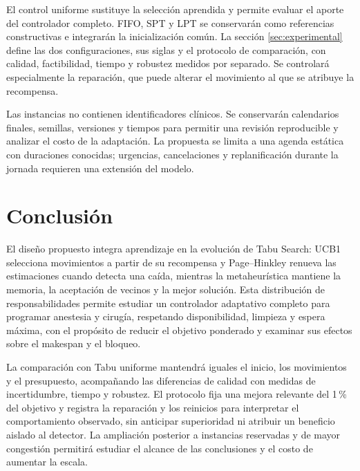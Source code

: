 \documentclass[12pt,letterpaper]{report}
\begin{document}
El control uniforme sustituye la selección aprendida y permite evaluar
el aporte del controlador completo. FIFO, SPT y LPT se conservarán como
referencias constructivas e integrarán la inicialización común. La sección
\ref{sec:experimental} define las dos configuraciones, sus siglas y el
protocolo de comparación, con calidad, factibilidad, tiempo y robustez
medidos por separado. Se controlará especialmente la reparación, que puede
alterar el movimiento al que se atribuye la recompensa.

Las instancias no contienen identificadores clínicos. Se conservarán
calendarios finales, semillas, versiones y tiempos para permitir una
revisión reproducible y analizar el costo de la adaptación. La propuesta
se limita a una agenda estática con duraciones conocidas; urgencias,
cancelaciones y replanificación durante la jornada requieren una extensión
del modelo.

\clearpage


\clearpage
\section{Conclusión}
El diseño propuesto integra aprendizaje en la evolución de Tabu Search:
UCB1 selecciona movimientos a partir de su recompensa y Page--Hinkley
renueva las estimaciones cuando detecta una caída, mientras la
metaheurística mantiene la memoria, la aceptación de vecinos y la mejor
solución. Esta distribución de responsabilidades permite estudiar un
controlador adaptativo completo para programar anestesia y cirugía,
respetando disponibilidad, limpieza y espera máxima, con el propósito
de reducir el objetivo ponderado y examinar sus efectos sobre el makespan
y el bloqueo.

La comparación con Tabu uniforme mantendrá iguales el inicio, los
movimientos y el presupuesto, acompañando las diferencias de calidad
con medidas de incertidumbre, tiempo y robustez. El protocolo fija una
mejora relevante del 1\,\% del objetivo y registra la reparación y los
reinicios para interpretar el comportamiento observado, sin anticipar
superioridad ni atribuir un beneficio aislado al detector. La ampliación
posterior a instancias reservadas y de mayor congestión permitirá
estudiar el alcance de las conclusiones y el costo de aumentar la escala.

\clearpage
\printbibliography[title={Referencias}]
\end{document}
